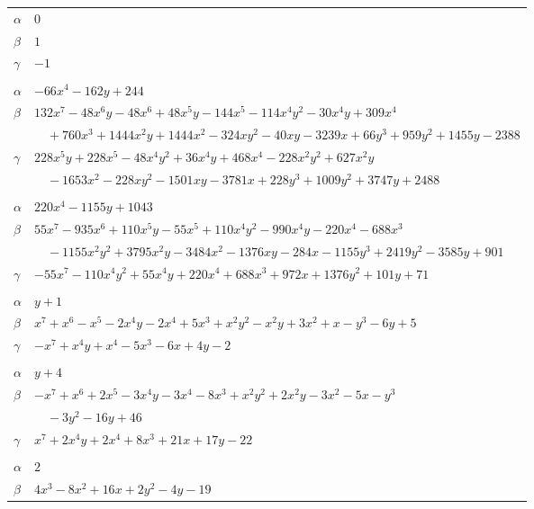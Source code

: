 \documentclass[11pt]{article}
\begin{document}
\begin{longtable}{@{}ll@{}}
$\alpha$ & $0$\\
$\beta$ & $1$\\
$\gamma$ & $-1$\\
\addlinespace[3pt]
\multicolumn{2}{@{}l}{$\{i,j\}=\{15,24\}$, $k_{ij}=2^{4}\cdot 3^{2}$}\\
$\alpha$ & $-66x^{4}-162y+244$\\
$\beta$ & $132x^{7}-48x^{6}y-48x^{6}+48x^{5}y-144x^{5}-114x^{4}y^{2}-30x^{4}y+309x^{4}$\\
 & $\quad +760x^{3}+1444x^{2}y+1444x^{2}-324xy^{2}-40xy-3239x+66y^{3}+959y^{2}+1455y-2388$\\
$\gamma$ & $228x^{5}y+228x^{5}-48x^{4}y^{2}+36x^{4}y+468x^{4}-228x^{2}y^{2}+627x^{2}y$\\
 & $\quad -1653x^{2}-228xy^{2}-1501xy-3781x+228y^{3}+1009y^{2}+3747y+2488$\\
\addlinespace[3pt]
\multicolumn{2}{@{}l}{$\{i,j\}=\{17,24\}$, $k_{ij}=2^{2}\cdot 3^{5}$}\\
$\alpha$ & $220x^{4}-1155y+1043$\\
$\beta$ & $55x^{7}-935x^{6}+110x^{5}y-55x^{5}+110x^{4}y^{2}-990x^{4}y-220x^{4}-688x^{3}$\\
 & $\quad -1155x^{2}y^{2}+3795x^{2}y-3484x^{2}-1376xy-284x-1155y^{3}+2419y^{2}-3585y+901$\\
$\gamma$ & $-55x^{7}-110x^{4}y^{2}+55x^{4}y+220x^{4}+688x^{3}+972x+1376y^{2}+101y+71$\\
\addlinespace[3pt]
\multicolumn{2}{@{}l}{$\{i,j\}=\{18,7\}$, $k_{ij}=2\cdot 3$}\\
$\alpha$ & $y+1$\\
$\beta$ & $x^{7}+x^{6}-x^{5}-2x^{4}y-2x^{4}+5x^{3}+x^{2}y^{2}-x^{2}y+3x^{2}+x-y^{3}-6y+5$\\
$\gamma$ & $-x^{7}+x^{4}y+x^{4}-5x^{3}-6x+4y-2$\\
\addlinespace[3pt]
\multicolumn{2}{@{}l}{$\{i,j\}=\{18,24\}$, $k_{ij}=2^{3}\cdot 3^{2}$}\\
$\alpha$ & $y+4$\\
$\beta$ & $-x^{7}+x^{6}+2x^{5}-3x^{4}y-3x^{4}-8x^{3}+x^{2}y^{2}+2x^{2}y-3x^{2}-5x-y^{3}$\\
 & $\quad -3y^{2}-16y+46$\\
$\gamma$ & $x^{7}+2x^{4}y+2x^{4}+8x^{3}+21x+17y-22$\\
\addlinespace[3pt]
\multicolumn{2}{@{}l}{$\{i,j\}=\{22,6\}$, $k_{ij}=2\cdot 3\cdot 17$}\\
$\alpha$ & $2$\\
$\beta$ & $4x^{3}-8x^{2}+16x+2y^{2}-4y-19$\\

\end{longtable}
\end{document}
